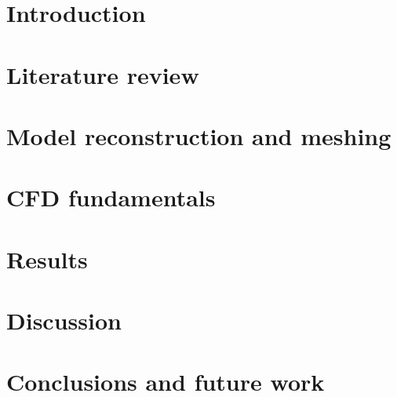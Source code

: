 \documentclass[12pt]{report}
\begin{document}
\chapter{Introduction}



\chapter{Literature review}



\chapter{Model reconstruction and meshing} \label{MRM}



\chapter{CFD fundamentals} \label{cfd}



\chapter{Results}



\chapter{Discussion}



\chapter{Conclusions and future work}






\end{document}
